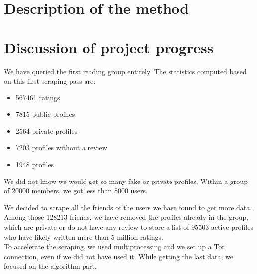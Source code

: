 \documentclass[11pt]{article}
\begin{document}
\section{Description of the method}


\section{Discussion of project progress}

We have queried the first reading group entirely.
The statistics computed based on this first scraping pass are:
\begin{itemize}
\item 567461 ratings
\item 7815 public profiles
\item 2564 private profiles
\item 7203 profiles without a review
\item 1948 profiles 
\end{itemize}

We did not know we would get so many fake or private profiles. Within a group of 20000 members, we got less than 8000 users.

We decided to scrape all the friends of the users we have found to get more data. 
Among those 128213 friends, we have removed the profiles already in the group, which are private or do not have any review to store a list of 95503 active profiles who have likely written more than 5 million ratings.  \\
To accelerate the scraping, we used multiprocessing and we set up a Tor connection, even if we did not have used it. 
While getting the last data, we focused on the algorithm part.




\end{document}

